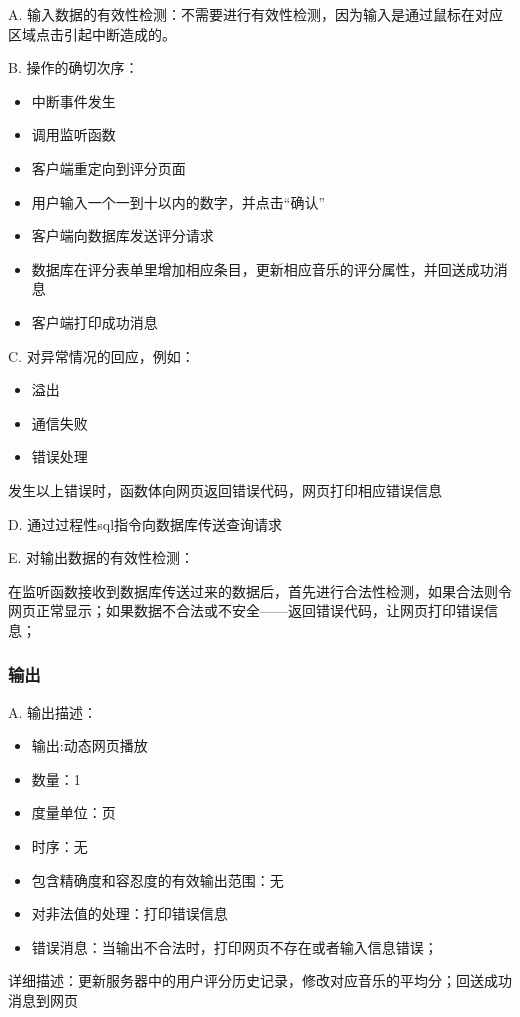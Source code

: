    
   
   A. 输入数据的有效性检测：不需要进行有效性检测，因为输入是通过鼠标在对应区域点击引起中断造成的。
   
   B. 操作的确切次序：
   \begin{adjustwidth}{2cm}{1cm}\qquad
	   \begin{itemize}
		\item 中断事件发生
		\item 调用监听函数
		\item 客户端重定向到评分页面
		\item 用户输入一个一到十以内的数字，并点击“确认”
		\item 客户端向数据库发送评分请求
		\item 数据库在评分表单里增加相应条目，更新相应音乐的评分属性，并回送成功消息
		\item 客户端打印成功消息
	   \end{itemize}		
   \end{adjustwidth}
	
   
   C. 对异常情况的回应，例如：
   \begin{adjustwidth}{2cm}{1cm}\qquad
	   \begin{itemize}
		   \item 溢出
		   \item 通信失败
		   \item 错误处理
	   \end{itemize}		
   \end{adjustwidth}
   
	   发生以上错误时，函数体向网页返回错误代码，网页打印相应错误信息
   
D. 通过过程性sql指令向数据库传送查询请求
		   
   E. 对输出数据的有效性检测：
   
   在监听函数接收到数据库传送过来的数据后，首先进行合法性检测，如果合法则令网页正常显示；如果数据不合法或不安全——返回错误代码，让网页打印错误信息；
   
   \subsubsection{输出}
   
   A. 输出描述：
   \begin{itemize}
	\item	输出:动态网页播放
	\item	数量：1
	\item	度量单位：页
	\item	时序：无
	\item	包含精确度和容忍度的有效输出范围：无
	\item	对非法值的处理：打印错误信息
	\item	错误消息：当输出不合法时，打印网页不存在或者输入信息错误；
   \end{itemize}
   详细描述：更新服务器中的用户评分历史记录，修改对应音乐的平均分；回送成功消息到网页



